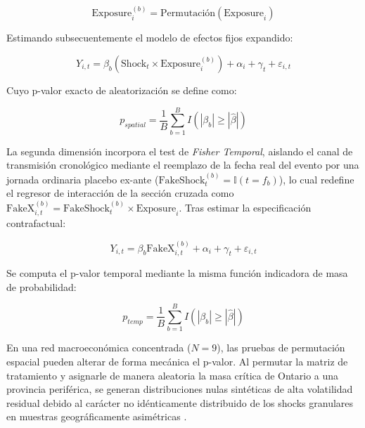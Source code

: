 \begin{equation}
    \text{Exposure}_i^{(b)} = \text{Permutaci\'on}(\text{Exposure}_i)
\end{equation}

Estimando subsecuentemente el modelo de efectos fijos expandido:

\begin{equation}
    Y_{i,t} = \beta_b (\text{Shock}_t \times \text{Exposure}_i^{(b)}) + \alpha_i + \gamma_t + \varepsilon_{i,t}
\end{equation}

Cuyo p-valor exacto de aleatorizaci\'on se define como:

\begin{equation}
    p_{spatial} = \frac{1}{B} \sum_{b=1}^{B} \textit{$I$} \left( \left| \beta_b \right| \ge \left| \hat{\beta} \right| \right)
\end{equation}

La segunda dimensi\'on incorpora el test de \textit{Fisher Temporal}, aislando el canal de transmisi\'on cronol\'ogico mediante el reemplazo de la fecha real del evento por una jornada ordinaria placebo ex-ante ($\text{FakeShock}_t^{(b)} = \mathbb{I}(t = f_b)$), lo cual redefine el regresor de interacci\'on de la secci\'on cruzada como $\text{FakeX}_{i,t}^{(b)} = \text{FakeShock}_t^{(b)} \times \text{Exposure}_i$. Tras estimar la especificaci\'on contrafactual:

\begin{equation}
    Y_{i,t} = \beta_b \text{FakeX}_{i,t}^{(b)} + \alpha_i + \gamma_t + \varepsilon_{i,t}
\end{equation}

Se computa el p-valor temporal mediante la misma funci\'on indicadora de masa de probabilidad:

\begin{equation}
    p_{temp} = \frac{1}{B} \sum_{b=1}^{B} \textit{$I$} \left( \left| \beta_b \right| \ge \left| \hat{\beta} \right| \right)
\end{equation}

En una red macroecon\'omica concentrada ($N=9$), las pruebas de permutaci\'on espacial pueden alterar de forma mec\'anica el p-valor. Al permutar la matriz de tratamiento y asignarle de manera aleatoria la masa cr\'itica de Ontario a una provincia perif\'erica, se generan distribuciones nulas sint\'eticas de alta volatilidad residual debido al car\'acter no id\'enticamente distribuido de los shocks granulares en muestras geogr\'aficamente asim\'etricas \citep{ferman2019inference, mackinnon2020randomization}.

